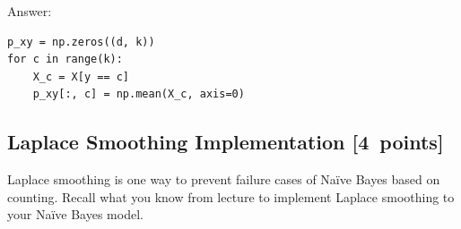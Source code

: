\documentclass{article}
\newcommand\pts[1]{\textcolor{pointscolour}{[#1~points]}}
\begin{document}
    \par\noindent\textcolor{gre}{Answer:}
\begin{lstlisting}
p_xy = np.zeros((d, k))
for c in range(k):
    X_c = X[y == c]
    p_xy[:, c] = np.mean(X_c, axis=0)
\end{lstlisting}



    \subsection{Laplace Smoothing Implementation \pts{4}}

    Laplace smoothing is one way to prevent failure cases of Na\"ive Bayes based on counting. Recall what you know from lecture to implement Laplace smoothing to your Na\"ive Bayes model.
\end{document}
